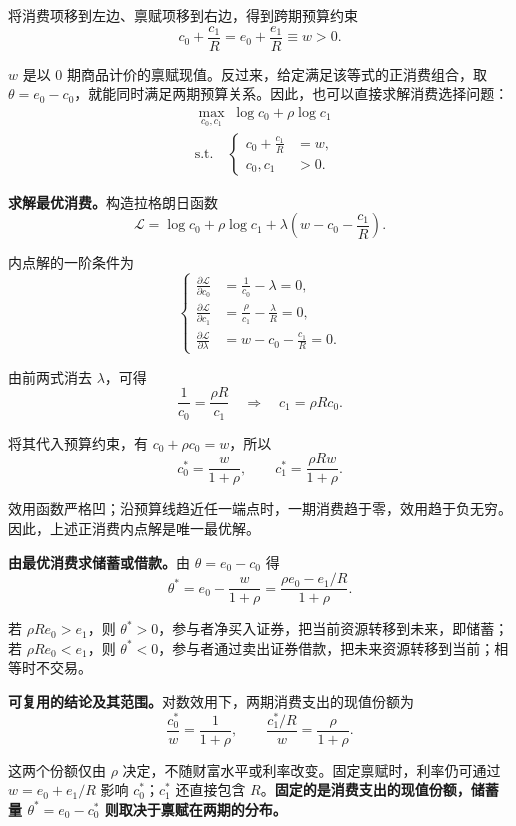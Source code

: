 \begin{tcolorbox}[example,title=补充算例：两期消费与储蓄]
\begin{solution}[blank-type=manual,blank-vsep=5\baselineskip]
将消费项移到左边、禀赋项移到右边，得到跨期预算约束
\[
 c_0+\frac{c_1}{R}=e_0+\frac{e_1}{R}\equiv w>0.
\]

$w$ 是以 0 期商品计价的禀赋现值。反过来，给定满足该等式的正消费组合，取 $\theta=e_0-c_0$，就能同时满足两期预算关系。因此，也可以直接求解消费选择问题：
\[
 \begin{aligned}
 &\max_{c_0,c_1}\;\log c_0+\rho\log c_1\\
 &\text{s.t.}\quad
 \left\{\begin{aligned}
 c_0+\frac{c_1}{R}&=w,\\
 c_0,c_1&>0.
 \end{aligned}\right.
 \end{aligned}
\]

\textbf{求解最优消费。}构造拉格朗日函数
\[
 \mathcal L=\log c_0+\rho\log c_1
   +\lambda\left(w-c_0-\frac{c_1}{R}\right).
\]

内点解的一阶条件为
\[
 \left\{\begin{aligned}
 \frac{\partial\mathcal L}{\partial c_0}
   &=\frac1{c_0}-\lambda=0,\\
 \frac{\partial\mathcal L}{\partial c_1}
   &=\frac{\rho}{c_1}-\frac{\lambda}{R}=0,\\
 \frac{\partial\mathcal L}{\partial\lambda}
   &=w-c_0-\frac{c_1}{R}=0.
 \end{aligned}\right.
\]

由前两式消去 $\lambda$，可得
\[
 \frac1{c_0}=\frac{\rho R}{c_1}
 \quad\Longrightarrow\quad c_1=\rho R c_0.
\]

将其代入预算约束，有 $c_0+\rho c_0=w$，所以
\[
 \boxed{c_0^*=\frac{w}{1+\rho}},\qquad
 \boxed{c_1^*=\frac{\rho Rw}{1+\rho}}.
\]

效用函数严格凹；沿预算线趋近任一端点时，一期消费趋于零，效用趋于负无穷。因此，上述正消费内点解是唯一最优解。

\textbf{由最优消费求储蓄或借款。}由 $\theta=e_0-c_0$ 得
\[
 \theta^*=e_0-\frac{w}{1+\rho}
 =\frac{\rho e_0-e_1/R}{1+\rho}.
\]

若 $\rho R e_0>e_1$，则 $\theta^*>0$，参与者净买入证券，把当前资源转移到未来，即储蓄；若 $\rho R e_0<e_1$，则 $\theta^*<0$，参与者通过卖出证券借款，把未来资源转移到当前；相等时不交易。

\tcbline

\textbf{可复用的结论及其范围。}对数效用下，两期消费支出的现值份额为
\[
 \frac{c_0^*}{w}=\frac1{1+\rho},\qquad
 \frac{c_1^*/R}{w}=\frac{\rho}{1+\rho}.
\]

这两个份额仅由 $\rho$ 决定，不随财富水平或利率改变。固定禀赋时，利率仍可通过 $w=e_0+e_1/R$ 影响 $c_0^*$；$c_1^*$ 还直接包含 $R$。\textbf{固定的是消费支出的现值份额，储蓄量 $\theta^*=e_0-c_0^*$ 则取决于禀赋在两期的分布。}


\end{solution}
\end{tcolorbox}
